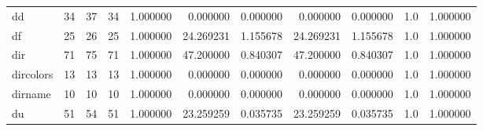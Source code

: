 \begin{longtable}{lrrrrrrrrrr}
dd        &                                      34 &                 37 &                                34 &                                   1.000000 &                               0.000000 &                                     0.000000 &                          0.000000 &                                0.000000 &                                1.0 &                                           1.000000 \\
df        &                                      25 &                 26 &                                25 &                                   1.000000 &                              24.269231 &                                     1.155678 &                         24.269231 &                                1.155678 &                                1.0 &                                           1.000000 \\
dir       &                                      71 &                 75 &                                71 &                                   1.000000 &                              47.200000 &                                     0.840307 &                         47.200000 &                                0.840307 &                                1.0 &                                           1.000000 \\
dircolors &                                      13 &                 13 &                                13 &                                   1.000000 &                               0.000000 &                                     0.000000 &                          0.000000 &                                0.000000 &                                1.0 &                                           1.000000 \\
dirname   &                                      10 &                 10 &                                10 &                                   1.000000 &                               0.000000 &                                     0.000000 &                          0.000000 &                                0.000000 &                                1.0 &                                           1.000000 \\
du        &                                      51 &                 54 &                                51 &                                   1.000000 &                              23.259259 &                                     0.035735 &                         23.259259 &                                0.035735 &                                1.0 &                                           1.000000 \\

\end{longtable}
